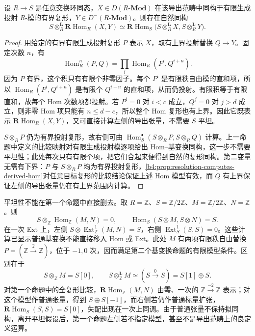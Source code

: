 \begin{proposition}\label{b4:prop:derived-base-change-perfect}
	设 \(R\to S\) 是任意交换环同态，\(X\in D(R\text{-}\mathbf{Mod})\) 在该导出范畴中同构于有限生成投射 \(R\)-模的有界复形，\(Y\in D^-(R\text{-}\mathbf{Mod})\)。则存在自然同构
	\[
		S\otimes_R^{\mathbf L}\mathbf R\operatorname{Hom}_R(X,Y) \simeq \mathbf R\operatorname{Hom}_S \bigl(S\otimes_R^{\mathbf L}X,S\otimes_R^{\mathbf L}Y\bigr).
	\]
\end{proposition}
\begin{proof}
	用给定的有界有限生成投射复形 \(P\) 表示 \(X\)，取有上界投射替换 \(Q\to Y\)。固定次数 \(n\)，有
	\[
		\operatorname{Hom}_R^n(P,Q) =\prod_i\operatorname{Hom}_R(P^i,Q^{i+n}).
	\]
	因为 \(P\) 有界，这个积只有有限个非零因子。每个 \(P^i\) 是有限秩自由模的直和项，所以 \(\operatorname{Hom}_R(P^i,Q^{i+n})\) 是有限个 \(Q^{i+n}\) 的直和项，从而仍投射。有限积等于有限直和，故每个 Hom 次数项都投射。若 \(P^i=0\) 对 \(i<c\) 成立，\(Q^j=0\) 对 \(j>d\) 成立，则非零 Hom 项只能有 \(n\le d-c\)，所以整个 Hom 复形也有上界。因此它既表示 \(\mathbf R\operatorname{Hom}_R(X,Y)\)，又可直接计算左侧的导出张量，不需要 \(S\) 平坦。

	\(S\otimes_RP\) 仍为有界投射复形，故右侧可由 \(\operatorname{Hom}_S^\bullet(S\otimes_RP,S\otimes_RQ)\) 计算。上一命题中定义的比较映射对有限生成投射模逐项给出 Hom--基变换同构，这一步不需要平坦性；此处每次只有有限个项，把它们合起来便得到自然的复形同构。第二变量无需有下界：\(P\) 与 \(S\otimes_RP\) 均为有界投射复形，\cref{b4:prop:resolution-computes-derived-hom}对任意目标复形的比较结论保证上述 Hom 模型有效，而 \(Q\) 有上界保证左侧的导出张量仍在有上界范围内计算。
\end{proof}

平坦性不能在第一个命题中直接删去。取 \(R=\mathbb Z\)、\(S=\mathbb Z/2\mathbb Z\)、\(M=\mathbb Z/2\mathbb Z\)、\(N=\mathbb Z\)。则
\[
	S\otimes_{\mathbb Z}\operatorname{Hom}_{\mathbb Z}(M,N)=0, \qquad \operatorname{Hom}_S(S\otimes M,S\otimes N)=S.
\]
在一次 Ext 上，左侧 \(S\otimes\operatorname{Ext}_{\mathbb Z}^1(M,N)=S\)，右侧 \(\operatorname{Ext}_S^1(S,S)=0\)。这些计算已显示普通基变换不能直接移入 Hom 或 Ext。此处 \(M\) 有两项有限秩自由替换 \(P=(\mathbb Z\xrightarrow{2}\mathbb Z)\)，位于 \(-1,0\) 次，因而满足第二个基变换命题的有限模型条件。区别在于
\[
	S\otimes_{\mathbb Z}M=S[0],\qquad S\otimes_{\mathbb Z}^{\mathbf L}M \simeq(S\xrightarrow{0}S)=S[1]\oplus S.
\]
对第一个命题中的全复形比较，\(\mathbf R\operatorname{Hom}_{\mathbb Z}(M,N)\) 由零、一次的 \(\mathbb Z\xrightarrow{-2}\mathbb Z\) 表示；对这个模型作普通张量，得到 \(S\oplus S[-1]\)，而右侧若仍作普通标量扩张，\(\mathbf R\operatorname{Hom}_S(S,S)=S[0]\)，失配出现在一次上同调。由于普通张量不保持拟同构，离开平坦假设后，第一个命题左侧若不指定模型，甚至不是导出范畴上的良定义运算。

